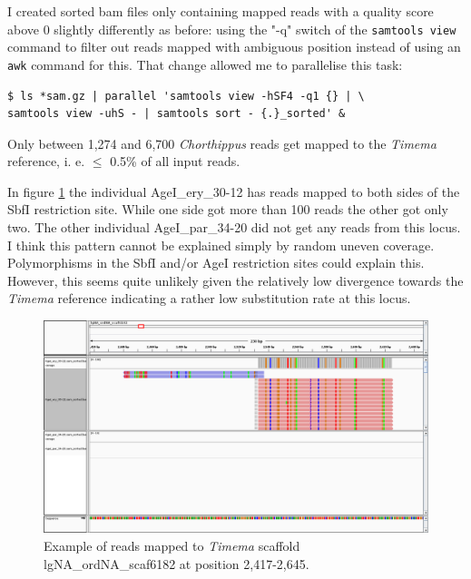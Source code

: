 \documentclass{article}\usepackage[]{graphicx}\usepackage[]{color}
\begin{document}
I created sorted bam files only containing mapped reads with a quality score above 0 slightly differently as before: using the "-q" switch of the \texttt{samtools view} command to filter out reads mapped with ambiguous position instead of using an \texttt{awk} command for this. That change allowed me to parallelise this task:
\begin{command}
\captionsetup{type=command}
\caption{Convert .sam files into postion sorted bam files in parallel filtering out unmapped reads and reads with mapping quality below 1}
\begin{Verbatim}
$ ls *sam.gz | parallel 'samtools view -hSF4 -q1 {} | \
samtools view -uhS - | samtools sort - {.}_sorted' &
\end{Verbatim}
\label{convert_sam_to_bam}
\end{command}
Only between 1,274 and 6,700 \textit{Chorthippus} reads get mapped to the \textit{Timema} reference, i. e. $\le$ 0.5\% of all input reads.

In figure \ref{igv_lgNA_ordNA_scaf6182} the individual AgeI\_ery\_30-12 has reads mapped to both sides of the SbfI restriction site. While one side got more than 100 reads the other got only two. The other individual AgeI\_par\_34-20 did not get any reads from this locus. I think this pattern cannot be explained simply by random uneven coverage. Polymorphisms in the SbfI and/or AgeI restriction sites could explain this. However, this seems quite unlikely given the relatively low divergence towards the \textit{Timema} reference indicating a rather low substitution rate at this locus.

\begin{figure}[hbp]
\centering
\includegraphics[width=\textwidth]{./figure/igv_lgNA_ordNA_scaf6182}
\caption{Example of reads mapped to \textit{Timema} scaffold lgNA\_ordNA\_scaf6182 at position 2,417-2,645. }
\label{igv_lgNA_ordNA_scaf6182}
\end{figure}
\end{document}
